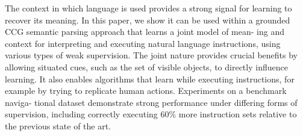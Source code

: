 The context in which language is used provides a strong signal for learning to recover its meaning. In this paper, we show it can be used within a grounded
 CCG semantic parsing approach that learns a joint model of mean- ing and
 context for interpreting and executing natural language instructions, using
 various types of weak supervision. The joint nature provides crucial benefits
 by allowing situated cues, such as the set of visible objects, to directly
 influence learning. It also enables algorithms that learn while executing
 instructions, for example by trying to replicate human actions. Experiments on
 a benchmark naviga- tional dataset demonstrate strong performance under
 differing forms of supervision, including correctly executing 60\% more
 instruction sets relative to the previous state of the art.


